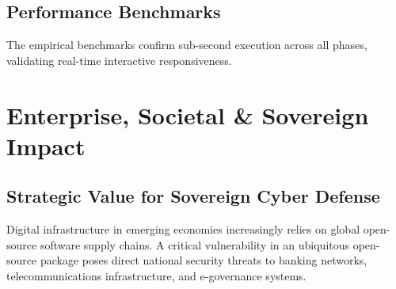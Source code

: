 \documentclass[12pt,a4paper,oneside]{report}
\begin{document}
\section{Performance Benchmarks}
\begin{table}[H]
    \centering
    \caption{Computational Latency Benchmarks for MARGVEDHA Pipeline Phases.}
    \label{tab:latency_benchmarks}
\end{table}

The empirical benchmarks confirm sub-second execution across all phases, validating real-time interactive responsiveness.

\chapter{Enterprise, Societal \& Sovereign Impact}

\section{Strategic Value for Sovereign Cyber Defense}
Digital infrastructure in emerging economies increasingly relies on global open-source software supply chains. A critical vulnerability in an ubiquitous open-source package poses direct national security threats to banking networks, telecommunications infrastructure, and e-governance systems. 
\end{document}
